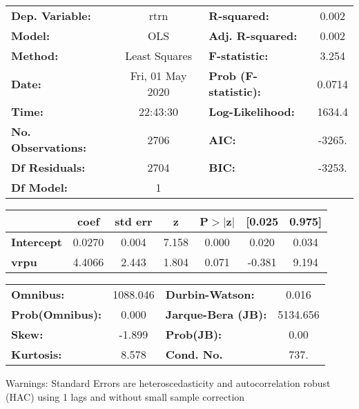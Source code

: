 \begin{center}
\begin{tabular}{lclc}
\toprule
\textbf{Dep. Variable:}    &       rtrn       & \textbf{  R-squared:         } &     0.002   \\
\textbf{Model:}            &       OLS        & \textbf{  Adj. R-squared:    } &     0.002   \\
\textbf{Method:}           &  Least Squares   & \textbf{  F-statistic:       } &     3.254   \\
\textbf{Date:}             & Fri, 01 May 2020 & \textbf{  Prob (F-statistic):} &   0.0714    \\
\textbf{Time:}             &     22:43:30     & \textbf{  Log-Likelihood:    } &    1634.4   \\
\textbf{No. Observations:} &        2706      & \textbf{  AIC:               } &    -3265.   \\
\textbf{Df Residuals:}     &        2704      & \textbf{  BIC:               } &    -3253.   \\
\textbf{Df Model:}         &           1      & \textbf{                     } &             \\
\bottomrule
\end{tabular}
\begin{tabular}{lcccccc}
                   & \textbf{coef} & \textbf{std err} & \textbf{z} & \textbf{P$> |$z$|$} & \textbf{[0.025} & \textbf{0.975]}  \\
\midrule
\textbf{Intercept} &       0.0270  &        0.004     &     7.158  &         0.000        &        0.020    &        0.034     \\
\textbf{vrpu}      &       4.4066  &        2.443     &     1.804  &         0.071        &       -0.381    &        9.194     \\
\bottomrule
\end{tabular}
\begin{tabular}{lclc}
\textbf{Omnibus:}       & 1088.046 & \textbf{  Durbin-Watson:     } &    0.016  \\
\textbf{Prob(Omnibus):} &   0.000  & \textbf{  Jarque-Bera (JB):  } & 5134.656  \\
\textbf{Skew:}          &  -1.899  & \textbf{  Prob(JB):          } &     0.00  \\
\textbf{Kurtosis:}      &   8.578  & \textbf{  Cond. No.          } &     737.  \\
\bottomrule
\end{tabular}
\end{center}

Warnings: \newline
 [1] Standard Errors are heteroscedasticity and autocorrelation robust (HAC) using 1 lags and without small sample correction
